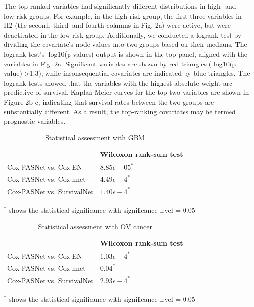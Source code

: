 \documentclass[10pt,twocolumn,twoside,lineno]{gsajnl}
\begin{document}
The top-ranked variables had significantly different distributions in high- and low-risk groups.
For example, in the high-risk group, the first three variables in H2 (the second, third, and fourth columns in Fig. 2a) were active, but were deactivated in the low-risk group.
Additionally, we conducted a logrank test by dividing the covariate's node values into two groups based on their medians.
The logrank test's -log10(p-values) output is shown in the top panel, aligned with the variables in Fig. 2a.
Significant variables are shown by red triangles (-log10(p-value) >1.3), while inconsequential covariates are indicated by blue triangles.
The logrank tests showed that the variables with the highest absolute weight are predictive of survival.
Kaplan-Meier curves for the top two variables are shown in Figure 2b-c, indicating that survival rates between the two groups are substantially different.
As a result, the top-ranking covariates may be termed prognostic variables. 


\begin{table}[H]
	
	\caption{Statistical assessment with GBM}
	\begin{tableminipage}{0.482\textwidth}
		\begin{tabularx}{\textwidth}{@{}XX@{}}
			\hline
			 & {\bf Wilcoxon rank-sum test}\\
			\hline
			Cox-PASNet vs. Cox-EN & $ 8.85e-05 ^{*} $ \\
			Cox-PASNet vs. Cox-nnet & $ 4.49e-4 ^{*} $ \\
			Cox-PASNet vs. SurvivalNet & $ 1.40e-4 ^{*} $ \\
			\hline
		\end{tabularx}
		\label{tab:shape-functions}
	\end{tableminipage}
	\footnotesize{$ ^{*} $ shows the statistical significance with significance level = 0.05}
\end{table}



\begin{table}[H]
	
	\caption{Statistical assessment with OV cancer}
	\begin{tableminipage}{0.482\textwidth}
		\begin{tabularx}{\textwidth}{@{}XX@{}}
			\hline
			& {\bf Wilcoxon rank-sum test}\\
			\hline
			Cox-PASNet vs. Cox-EN & $ 1.03e-4 ^{*} $ \\
			Cox-PASNet vs. Cox-nnet & $ 0.04 ^{*} $ \\
			Cox-PASNet vs. SurvivalNet & $ 2.93e-4 ^{*} $ \\
			\hline
		\end{tabularx}
		\label{tab:shape-functions}
	\end{tableminipage}
	\footnotesize{$ ^{*} $ shows the statistical significance with significance level = 0.05}
\end{table}
\end{document}
